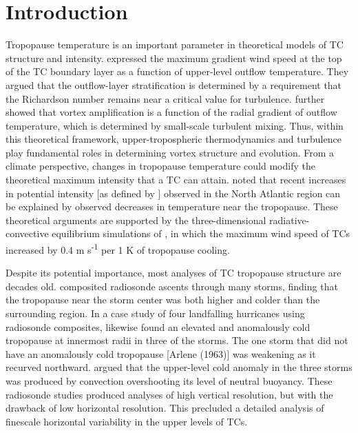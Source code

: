 \chapter{Introduction}
\label{intro}

\indent \indent Tropopause temperature is an important parameter in theoretical models of TC structure and intensity.
\cite{EmanuelRotunno2011} expressed the maximum gradient wind speed at the top of the TC boundary layer as a function of upper-level outflow temperature.
They argued that the outflow-layer stratification is determined by a requirement that the Richardson number remains near a critical value for turbulence.
\cite{Emanuel2012} further showed that vortex amplification is a function of the radial gradient of outflow temperature, which is determined by small-scale turbulent mixing.
Thus, within this theoretical framework, upper-tropospheric thermodynamics and turbulence play fundamental roles in determining vortex structure and evolution.
From a climate perspective, changes in tropopause temperature could modify the theoretical maximum intensity that a TC can attain.
\cite{Emanueletal2013} noted that recent increases in potential intensity [as defined by \cite{BisterEmanuel1998}] observed in the North Atlantic region can be explained by observed decreases in temperature near the tropopause.
These theoretical arguments are supported by the three-dimensional radiative-convective equilibrium simulations of \cite{Wangetal2014}, in which the maximum wind speed of TCs increased by 0.4 m s\textsuperscript{-1} per 1 K of tropopause cooling.

Despite its potential importance, most analyses of TC tropopause structure are decades old.
\cite{JordanJordan1954} composited radiosonde ascents through many storms, finding that the tropopause near the storm center was both higher and colder than the surrounding region.
In a case study of four landfalling hurricanes using radiosonde composites, \cite{Koteswaram1967} likewise found an elevated and anomalously cold tropopause at innermost radii in three of the storms.
The one storm that did not have an anomalously cold tropopause [Arlene (1963)] was weakening as it recurved northward.
\cite{Koteswaram1967} argued that the upper-level cold anomaly in the three storms was produced by convection overshooting its level of neutral buoyancy.
These radiosonde studies produced analyses of high vertical resolution, but with the drawback of low horizontal resolution.
This precluded a detailed analysis of finescale horizontal variability in the upper levels of TCs.

